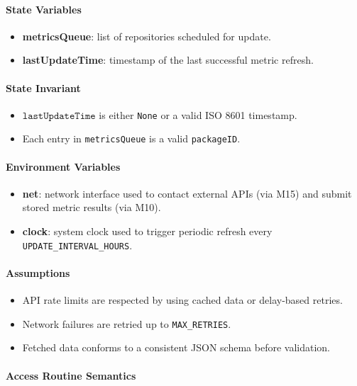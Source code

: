 \documentclass[12pt, titlepage]{article}
\begin{document}
\paragraph{State Variables}
\begin{itemize}
  \item \textbf{metricsQueue}: list of repositories scheduled for update.
  \item \textbf{lastUpdateTime}: timestamp of the last successful metric refresh.
\end{itemize}

\paragraph{State Invariant}
\begin{itemize}
  \item $\texttt{lastUpdateTime}$ is either \texttt{None} or a valid ISO 8601 timestamp.
  \item Each entry in \texttt{metricsQueue} is a valid \texttt{packageID}.
\end{itemize}

\paragraph{Environment Variables}
\begin{itemize}
  \item \textbf{net}: network interface used to contact external APIs (via M15) and submit stored metric results (via M10).
  \item \textbf{clock}: system clock used to trigger periodic refresh every \texttt{UPDATE\_INTERVAL\_HOURS}.
\end{itemize}

\paragraph{Assumptions}
\begin{itemize}
  \item API rate limits are respected by using cached data or delay-based retries.
  \item Network failures are retried up to \texttt{MAX\_RETRIES}.
  \item Fetched data conforms to a consistent JSON schema before validation.
\end{itemize}

\paragraph{Access Routine Semantics}
\end{document}
